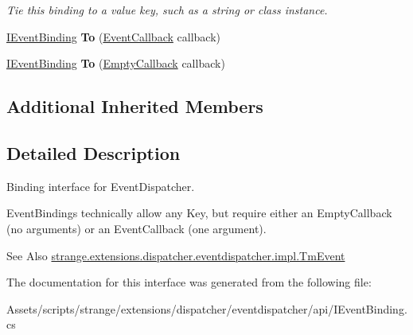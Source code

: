 \begin{DoxyCompactItemize}
\begin{DoxyCompactList}\small\item\em Tie this binding to a value key, such as a string or class instance. \end{DoxyCompactList}\item 
\hypertarget{interfacestrange_1_1extensions_1_1dispatcher_1_1eventdispatcher_1_1api_1_1_i_event_binding_aa3ea162300b1c274476c5f89c3ddbecb}{\hyperlink{interfacestrange_1_1extensions_1_1dispatcher_1_1eventdispatcher_1_1api_1_1_i_event_binding}{I\-Event\-Binding} {\bfseries To} (\hyperlink{namespacestrange_1_1extensions_1_1dispatcher_1_1eventdispatcher_1_1api_a5b2a372c9c074884178eb4a32992afd3}{Event\-Callback} callback)}\label{interfacestrange_1_1extensions_1_1dispatcher_1_1eventdispatcher_1_1api_1_1_i_event_binding_aa3ea162300b1c274476c5f89c3ddbecb}

\item 
\hypertarget{interfacestrange_1_1extensions_1_1dispatcher_1_1eventdispatcher_1_1api_1_1_i_event_binding_a57463800a377374ccab15f11e0500457}{\hyperlink{interfacestrange_1_1extensions_1_1dispatcher_1_1eventdispatcher_1_1api_1_1_i_event_binding}{I\-Event\-Binding} {\bfseries To} (\hyperlink{namespacestrange_1_1extensions_1_1dispatcher_1_1eventdispatcher_1_1api_a4d68e68b31e6e0f733bd72ddcd6111fa}{Empty\-Callback} callback)}\label{interfacestrange_1_1extensions_1_1dispatcher_1_1eventdispatcher_1_1api_1_1_i_event_binding_a57463800a377374ccab15f11e0500457}

\end{DoxyCompactItemize}
\subsection*{Additional Inherited Members}


\subsection{Detailed Description}
Binding interface for Event\-Dispatcher. 

Event\-Bindings technically allow any Key, but require either an Empty\-Callback (no arguments) or an Event\-Callback (one argument).

\begin{DoxySeeAlso}{See Also}
\hyperlink{classstrange_1_1extensions_1_1dispatcher_1_1eventdispatcher_1_1impl_1_1_tm_event}{strange.\-extensions.\-dispatcher.\-eventdispatcher.\-impl.\-Tm\-Event} 
\end{DoxySeeAlso}


The documentation for this interface was generated from the following file\-:\begin{DoxyCompactItemize}
\item 
Assets/scripts/strange/extensions/dispatcher/eventdispatcher/api/I\-Event\-Binding.\-cs\end{DoxyCompactItemize}
